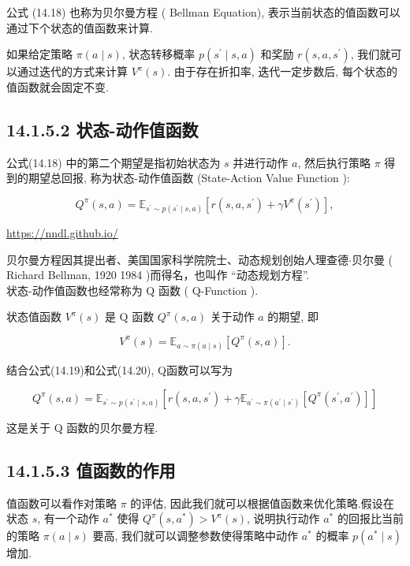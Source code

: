 \documentclass[10pt]{article}
\begin{document}
公式 (14.18) 也称为贝尔曼方程 ( Bellman Equation), 表示当前状态的值函数可以通过下个状态的值函数来计算.

如果给定策略 $\pi(a \mid s)$, 状态转移概率 $p\left(s^{\prime} \mid s, a\right)$ 和奖励 $r\left(s, a, s^{\prime}\right)$, 我们就可以通过迭代的方式来计算 $V^{\pi}(s)$. 由于存在折扣率, 迭代一定步数后, 每个状态的值函数就会固定不变.

\subsection*{14.1.5.2 状态-动作值函数}
公式(14.18) 中的第二个期望是指初始状态为 $s$ 并进行动作 $a$, 然后执行策略 $\pi$ 得到的期望总回报, 称为状态-动作值函数 (State-Action Value Function ):


\begin{equation*}
Q^{\pi}(s, a)=\mathbb{E}_{s^{\prime} \sim p\left(s^{\prime} \mid s, a\right)}\left[r\left(s, a, s^{\prime}\right)+\gamma V^{\pi}\left(s^{\prime}\right)\right], \tag{14.19}
\end{equation*}


\href{https://nndl.github.io/}{https://nndl.github.io/}

贝尔曼方程因其提出者、美国国家科学院院士、动态规划创始人理查德$\cdot$贝尔曼 ( Richard Bellman, 1920 1984 )而得名，也叫作 “动态规划方程”.\\
状态-动作值函数也经常称为 $\mathrm{Q}$ 函数 ( $\mathrm{Q}$-Function ).

状态值函数 $V^{\pi}(s)$ 是 $\mathrm{Q}$ 函数 $Q^{\pi}(s, a)$ 关于动作 $a$ 的期望, 即


\begin{equation*}
V^{\pi}(s)=\mathbb{E}_{a \sim \pi(a \mid s)}\left[Q^{\pi}(s, a)\right] . \tag{14.20}
\end{equation*}


结合公式(14.19)和公式(14.20), Q函数可以写为


\begin{equation*}
Q^{\pi}(s, a)=\mathbb{E}_{s^{\prime} \sim p\left(s^{\prime} \mid s, a\right)}\left[r\left(s, a, s^{\prime}\right)+\gamma \mathbb{E}_{a^{\prime} \sim \pi\left(a^{\prime} \mid s^{\prime}\right)}\left[Q^{\pi}\left(s^{\prime}, a^{\prime}\right)\right]\right] \tag{14.21}
\end{equation*}


这是关于 $\mathrm{Q}$ 函数的贝尔曼方程.

\subsection*{14.1.5.3 值函数的作用}
值函数可以看作对策略 $\pi$ 的评估, 因此我们就可以根据值函数来优化策略.假设在状态 $s$, 有一个动作 $a^{*}$ 使得 $Q^{\pi}\left(s, a^{*}\right)>V^{\pi}(s)$, 说明执行动作 $a^{*}$ 的回报比当前的策略 $\pi(a \mid s)$ 要高, 我们就可以调整参数使得策略中动作 $a^{*}$ 的概率 $p\left(a^{*} \mid s\right)$增加.
\end{document}
